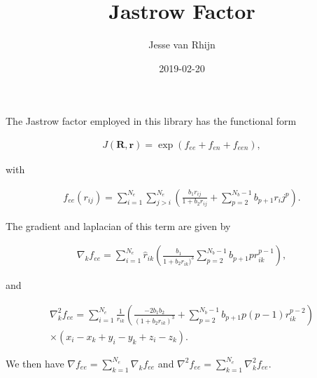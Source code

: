 \documentclass{article}
\title{Jastrow Factor}
\author{Jesse van Rhijn}
\date{2019-02-20}
\begin{document}
\maketitle

The Jastrow factor employed in this library has the functional form

\begin{align}
  J(\mathbf{R}, \mathbf{r}) = \exp(f_{ee} + f_{en} + f_{een}),
\end{align}

with 

\begin{align}
  f_{ee}(r_{ij}) = \sum_{i=1}^{N_e}\sum_{j > i}^{N_e} 
    \left( \frac{b_1 r_{ij}}{1 + b_2 r_{ij}} + \sum_{p=2}^{N_b - 1} b_{p+1}r_ij^p \right).
\end{align}

The gradient and laplacian of this term are given by

\begin{align}
  \nabla_k f_{ee} = \sum_{i=1}^{N_e} \hat{r}_{ik}\left( \frac{b_1}{1 + b_2 r_{ik})^3}
    \sum_{p=2}^{N_b - 1} b_{p+1}pr_{ik}^{p-1} \right),
\end{align}

and

\begin{align}
  \nabla^2_k f_{ee} = \sum_{i=1}^{N_e} \frac{1}{r_{ik}}
    \left( \frac{-2 b_1 b_2}{(1 + b_2 r_{ik})^3}
    + \sum_{p=2}^{N_b - 1} b_{p+1}p(p-1)r_{ik}^{p-2}\right) \\ 
    \times (x_i - x_k + y_i - y_k + z_i - z_k).
\end{align}

We then have $\nabla f_{ee} = \sum_{k=1}^{N_e} \nabla_k f_{ee}$ and $\nabla^2 f_{ee} = \sum_{k=1}^{N_e}\nabla^2_k f_{ee}$. 
\end{document}
